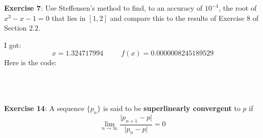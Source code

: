 \documentclass{article}
\begin{document}
\textbf{Exercise 7}: Use Steffensen's method to find, to an accuracy of $10^{-4}$, the root of $x^{3} - x - 1 = 0$ that lies in $[1, 2]$ and compare this to the results of Exercise $8$ of Section $2.2$.
    \begin{answer}
        I got:
            \begin{equation*}
                x = 1.324717994 \hspace{30pt} f(x) = 0.0000008245189529
            \end{equation*}
        Here is the code:
        \inputminted{matlab}{code/steffensen/steffensen.m}
        \inputminted{matlab}{code/Aitken.m}
        \inputminted{matlab}{code/myfunc3.m}
        \inputminted{matlab}{code/script3.m}
    \end{answer}

\textbf{Exercise 14}: A sequence $\{p_{n}\}$ is said to be \textbf{superlinearly convergent} to $p$ if
    \begin{equation*}
        \lim\limits_{n \to \infty} \dfrac{\lvert p_{n + 1} - p \rvert}{\lvert p_{n} - p \rvert} = 0
    \end{equation*}
\end{document}
